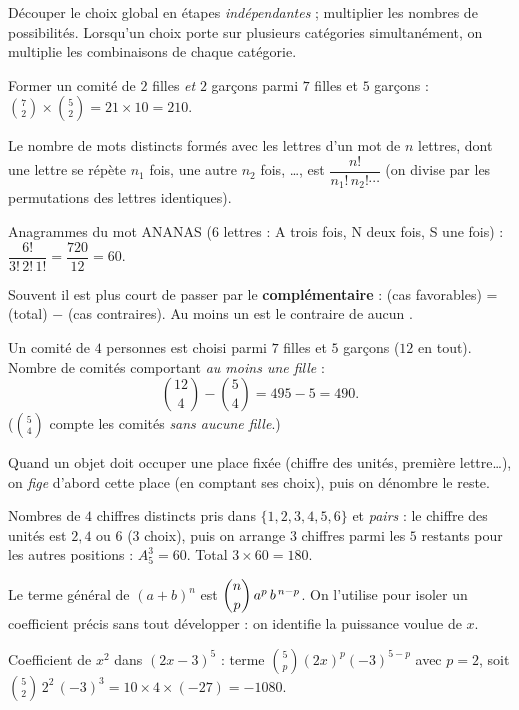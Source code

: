 Découper le choix global en étapes \emph{indépendantes} ; multiplier les nombres de possibilités. Lorsqu'un choix porte sur plusieurs catégories simultanément, on multiplie les combinaisons de chaque catégorie.
\begin{exemple}
Former un comité de $2$ filles \emph{et} $2$ garçons parmi $7$ filles et $5$ garçons :
$\binom72\times\binom52=21\times 10=210$.
\end{exemple}

Le nombre de mots distincts formés avec les lettres d'un mot de $n$ lettres, dont une lettre se répète $n_1$ fois, une autre $n_2$ fois, \dots, est $\dfrac{n!}{n_1!\,n_2!\cdots}$ (on divise par les permutations des lettres identiques).
\begin{exemple}
Anagrammes du mot ANANAS ($6$ lettres : A trois fois, N deux fois, S une fois) :
$\dfrac{6!}{3!\,2!\,1!}=\dfrac{720}{12}=60$.
\end{exemple}

Souvent il est plus court de passer par le \textbf{complémentaire} : (cas favorables) = (total) $-$ (cas contraires). \og Au moins un \fg{} est le contraire de \og aucun \fg.
\begin{exemple}
Un comité de $4$ personnes est choisi parmi $7$ filles et $5$ garçons ($12$ en tout). Nombre de comités comportant \emph{au moins une fille} :
\[
\binom{12}{4}-\binom{5}{4}=495-5=490.
\]
($\binom54$ compte les comités \emph{sans aucune fille}.)
\end{exemple}

Quand un objet doit occuper une place fixée (chiffre des unités, première lettre\dots),
on \emph{fige} d'abord cette place (en comptant ses choix), puis on dénombre le reste.
\begin{exemple}
Nombres de $4$ chiffres distincts pris dans $\{1,2,3,4,5,6\}$ et \emph{pairs} : le chiffre
des unités est $2,4$ ou $6$ ($3$ choix), puis on arrange $3$ chiffres parmi les $5$ restants
pour les autres positions : $A_5^{3}=60$. Total $3\times 60=180$.
\end{exemple}

Le terme général de $(a+b)^{n}$ est $\dbinom np\,a^{p}\,b^{\,n-p}$. On l'utilise pour isoler un coefficient précis sans tout développer : on identifie la puissance voulue de $x$.
\begin{exemple}
Coefficient de $x^{2}$ dans $(2x-3)^{5}$ : terme $\binom5p(2x)^{p}(-3)^{5-p}$ avec $p=2$, soit
$\binom52\,2^{2}\,(-3)^{3}=10\times 4\times(-27)=-1080$.
\end{exemple}

